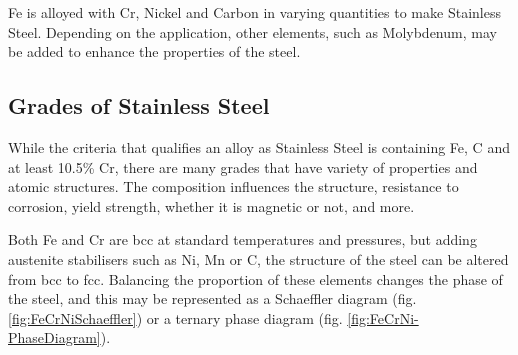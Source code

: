 Fe is alloyed with Cr, Nickel and Carbon in varying quantities to make Stainless Steel.  Depending on the application, other elements, such as Molybdenum, may be added to enhance the properties of the steel.

\subsection{Grades of Stainless Steel}

While the criteria that qualifies an alloy as Stainless Steel is containing Fe, \Gls{C} and at least 10.5\% Cr, there are many grades that have variety of properties and atomic structures.  The composition influences the structure, resistance to corrosion, yield strength, whether it is magnetic or not, and more.

Both Fe and Cr are \acrshort{bcc} at standard temperatures and pressures, but adding austenite stabilisers such as Ni, Mn or C, the structure of the steel can be altered from \acrshort{bcc} to \acrshort{fcc}.  Balancing the proportion of these elements changes the phase of the steel, and this may be represented as a Schaeffler diagram (fig. \ref{fig:FeCrNiSchaeffler}) or a ternary phase diagram (fig. \ref{fig:FeCrNi-PhaseDiagram}).


